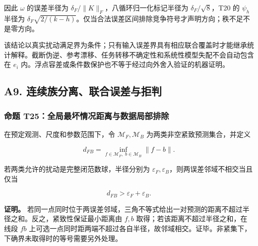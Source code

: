 \documentclass[11pt,a4paper]{article}
\begin{document}
因此 \(\omega\) 的误差半径为
\(\delta_F/\|K\|_F\)，八循环归一化标记半径为 \(\delta_F/\sqrt8\)，T20 的
\(\psi_h\) 半径为
\(\delta_F\sqrt{2/(k-h)}\)。仅当合法误差区间排除竞争符号才声明方向；秩不足不是零方向。

该结论以真实扰动满足界为条件；只有输入误差界具有相应联合覆盖时才能继承统计解释。截断伪逆、参考漂移、任务转移不确定性和系统性模型失配不会自动包含在
\(e_i\) 内。浮点容差或条件数保护也不等于经过向外舍入验证的机器证明。

\subsection{A9.
连续族分离、联合误差与拒判}\label{a9.-ux8fdeux7eedux65cfux5206ux79bbux8054ux5408ux8befux5deeux4e0eux62d2ux5224}

\subsubsection{命题
T25：全局最坏情况距离与数据局部排除}\label{ux547dux9898-t25ux5168ux5c40ux6700ux574fux60c5ux51b5ux8dddux79bbux4e0eux6570ux636eux5c40ux90e8ux6392ux9664}

\par
\noindent\begin{minipage}{\linewidth}

在预定观测、尺度和参数范围下，令 \(\mathcal M_F,\mathcal M_B\)
为两类非空紧致预测集合，并定义

\[
d_{FB}=\inf_{f\in\mathcal M_F,\;b\in\mathcal M_B}\|f-b\|.
\]

\end{minipage}\par

\par
\noindent\begin{minipage}{\linewidth}

若两类允许的扰动是完整闭范数球，半径分别为
\(\varepsilon_F,\varepsilon_B\)，则两误差邻域不相交当且仅当

\[
d_{FB}>\varepsilon_F+\varepsilon_B.
\]

\end{minipage}\par

\textbf{证明。}
若同一点同时位于两误差邻域，三角不等式给出一对预测的距离不超过半径之和。反之，紧致性保证最小距离由
\(f,b\) 取得；若该距离不超过半径之和，在线段 \(fb\)
上可选一点同时距两端不超过各自半径，故邻域相交。证毕。非紧集下，下确界未取得时的等号需要另外处理。
\end{document}
